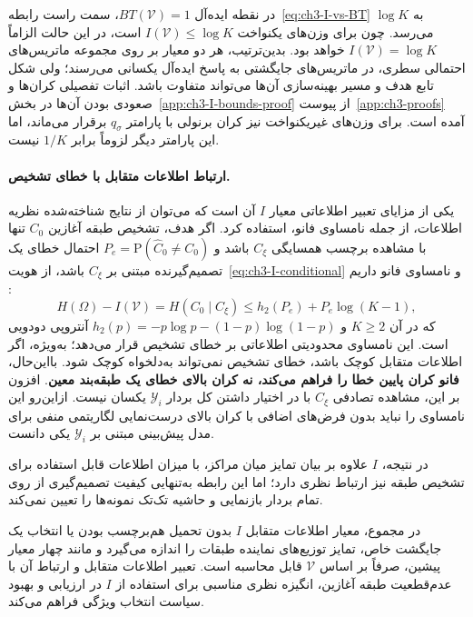 در نقطه ایده‌آل $BT(\mathcal V)=1$، سمت راست رابطه~\eqref{eq:ch3-I-vs-BT} به $\log K$ می‌رسد. چون برای وزن‌های یکنواخت $I(\mathcal V)\le\log K$ است، در این حالت الزاماً $I(\mathcal V)=\log K$ خواهد بود. بدین‌ترتیب، هر دو معیار بر روی مجموعه ماتریس‌های احتمالی سطری، در ماتریس‌های جایگشتی به پاسخ ایده‌آل یکسانی می‌رسند؛ ولی شکل تابع هدف و مسیر بهینه‌سازی آن‌ها می‌تواند متفاوت باشد. اثبات تفصیلی کران‌ها و صعودی بودن آن‌ها در بخش~\ref{app:ch3-I-bounds-proof} از پیوست~\ref{app:ch3-proofs} آمده است. برای وزن‌های غیریکنواخت نیز کران برنولی با پارامتر $q_\sigma$ برقرار می‌ماند، اما این پارامتر دیگر لزوماً برابر $1/K$ نیست.

\paragraph{ارتباط اطلاعات متقابل با خطای تشخیص.}
یکی از مزایای تعبیر اطلاعاتی معیار $I$ آن است که می‌توان از نتایج شناخته‌شده نظریه اطلاعات، از جمله نامساوی فانو، استفاده کرد. اگر هدف، تشخیص طبقه آغازین $C_0$ تنها با مشاهده برچسب همسایگی $C_\xi$ باشد و $P_e=\mathrm P(\widehat C_0\ne C_0)$ احتمال خطای یک تصمیم‌گیرنده مبتنی بر $C_\xi$ باشد، از هویت~\eqref{eq:ch3-I-conditional} و نامساوی فانو داریم \cite{CoverThomas2006}:
\begin{equation}\label{eq:ch3-I-Fano}
\boxed{H(\Omega)-I(\mathcal V)
=H(C_0\mid C_\xi)
\le h_2(P_e)+P_e\log(K-1),}
\end{equation}
که در آن $K\ge2$ و $h_2(p)=-p\log p-(1-p)\log(1-p)$ آنتروپی دودویی است. این نامساوی محدودیتی اطلاعاتی بر خطای تشخیص قرار می‌دهد؛ به‌ویژه، اگر اطلاعات متقابل کوچک باشد، خطای تشخیص نمی‌تواند به‌دلخواه کوچک شود. بااین‌حال، \textbf{فانو کران پایین خطا را فراهم می‌کند، نه کران بالای خطای یک طبقه‌بند معین}. افزون بر این، مشاهده تصادفی $C_\xi$ با در اختیار داشتن کل بردار $\mathscr Y_i$ یکسان نیست. ازاین‌رو این نامساوی را نباید بدون فرض‌های اضافی با کران بالای درست‌نمایی لگاریتمی منفی برای مدل پیش‌بینی مبتنی بر $\mathscr Y_i$ یکی دانست.

در نتیجه، $I$ علاوه بر بیان تمایز میان مراکز، با میزان اطلاعات
قابل استفاده برای تشخیص طبقه نیز ارتباط نظری دارد؛
اما این رابطه به‌تنهایی کیفیت تصمیم‌گیری از روی
تمام بردار بازنمایی و حاشیه تک‌تک نمونه‌ها را تعیین نمی‌کند.

در مجموع، معیار اطلاعات متقابل $I$ بدون تحمیل هم‌برچسب بودن یا انتخاب یک جایگشت خاص، تمایز توزیع‌های نماینده طبقات را اندازه می‌گیرد و مانند چهار معیار پیشین، صرفاً بر اساس $\mathcal V$ قابل محاسبه است. تعبیر اطلاعات متقابل و ارتباط آن با عدم‌قطعیت طبقه آغازین، انگیزه نظری مناسبی برای استفاده از $I$ در ارزیابی و بهبود سیاست انتخاب ویژگی فراهم می‌کند.


